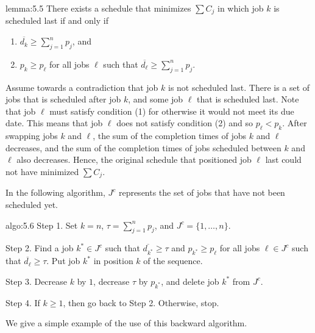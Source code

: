 \begin{lemma}{lemma:5.5}
    There exists a schedule that minimizes $\sum C_j$ in which job $k$ 
    is scheduled last if and only if 
    \begin{enumerate}[(1)]
        \item $\overline{d_k} \geq \sum_{j=1}^n p_j$, and 
        \item $p_k \geq p_\ell$ for all jobs $\ell$ such that 
        $\overline{d_\ell} \geq \sum_{j=1}^n p_j$. 
    \end{enumerate}
\end{lemma}
\begin{pf} 
    Assume towards a contradiction that job $k$ is not scheduled last. 
    There is a set of jobs that is scheduled after job $k$, and 
    some job $\ell$ that is scheduled last. Note that job $\ell$ 
    must satisfy condition (1) for otherwise it would not meet its due date. 
    This means that job $\ell$ does not satisfy condition (2) and 
    so $p_\ell < p_k$. After swapping jobs $k$ and $\ell$, the sum of the 
    completion times of jobs $k$ and $\ell$ decreases, and the sum of the 
    completion times of jobs scheduled between $k$ and $\ell$ also decreases. 
    Hence, the original schedule that positioned job $\ell$ last could not have 
    minimized $\sum C_j$. 
\end{pf}

In the following algorithm, $J^c$ represents the set of jobs that have 
not been scheduled yet. 

\begin{algo}{algo:5.6}
    {\sc Step 1.} Set $k = n$, $\tau = \sum_{j=1}^n p_j$, and $J^c = \{1, \dots, n\}$. 

    {\sc Step 2.} Find a job $k^* \in J^c$ such that $\overline{d_{k^*}} \geq \tau$ 
    and $p_{k^*} \geq p_\ell$ for all jobs $\ell \in J^c$ such that 
    $\overline{d_\ell} \geq \tau$. Put job $k^*$ in position $k$ of the sequence. 

    {\sc Step 3.} Decrease $k$ by $1$, decrease $\tau$ by $p_{k^*}$, and 
    delete job $k^*$ from $J^c$. 

    {\sc Step 4.} If $k \geq 1$, then go back to Step 2. Otherwise, stop. 
\end{algo}

We give a simple example of the use of this backward algorithm. 


